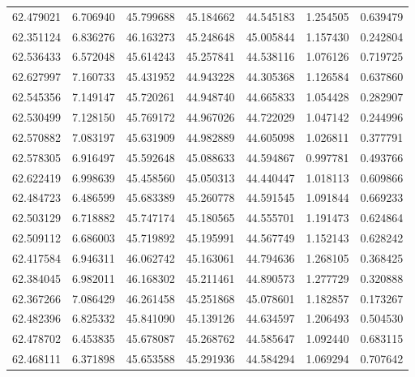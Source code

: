 \begin{tabular}{rrrrrrr}
 62.479021 &   6.706940 &         45.799688 &         45.184662 &         44.545183 &  1.254505 &  0.639479 \\
 62.351124 &   6.836276 &         46.163273 &         45.248648 &         45.005844 &  1.157430 &  0.242804 \\
 62.536433 &   6.572048 &         45.614243 &         45.257841 &         44.538116 &  1.076126 &  0.719725 \\
 62.627997 &   7.160733 &         45.431952 &         44.943228 &         44.305368 &  1.126584 &  0.637860 \\
 62.545356 &   7.149147 &         45.720261 &         44.948740 &         44.665833 &  1.054428 &  0.282907 \\
 62.530499 &   7.128150 &         45.769172 &         44.967026 &         44.722029 &  1.047142 &  0.244996 \\
 62.570882 &   7.083197 &         45.631909 &         44.982889 &         44.605098 &  1.026811 &  0.377791 \\
 62.578305 &   6.916497 &         45.592648 &         45.088633 &         44.594867 &  0.997781 &  0.493766 \\
 62.622419 &   6.998639 &         45.458560 &         45.050313 &         44.440447 &  1.018113 &  0.609866 \\
 62.484723 &   6.486599 &         45.683389 &         45.260778 &         44.591545 &  1.091844 &  0.669233 \\
 62.503129 &   6.718882 &         45.747174 &         45.180565 &         44.555701 &  1.191473 &  0.624864 \\
 62.509112 &   6.686003 &         45.719892 &         45.195991 &         44.567749 &  1.152143 &  0.628242 \\
 62.417584 &   6.946311 &         46.062742 &         45.163061 &         44.794636 &  1.268105 &  0.368425 \\
 62.384045 &   6.982011 &         46.168302 &         45.211461 &         44.890573 &  1.277729 &  0.320888 \\
 62.367266 &   7.086429 &         46.261458 &         45.251868 &         45.078601 &  1.182857 &  0.173267 \\
 62.482396 &   6.825332 &         45.841090 &         45.139126 &         44.634597 &  1.206493 &  0.504530 \\
 62.478702 &   6.453835 &         45.678087 &         45.268762 &         44.585647 &  1.092440 &  0.683115 \\
 62.468111 &   6.371898 &         45.653588 &         45.291936 &         44.584294 &  1.069294 &  0.707642 \\

\end{tabular}
